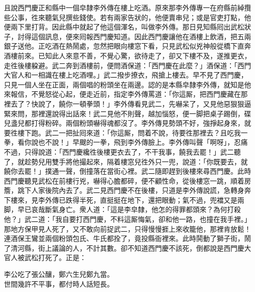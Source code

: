 且說西門慶正和縣中一個皁隸李外傳在樓上吃酒。原來那李外傳專一在府縣前綽攬些公事，徃來聽氣兒撰些錢使。若有兩家告狀的，他便賣串兒；或是官吏打點，他便兩下里打背。因此縣中就起了他這個渾名，叫做李外傳。那日見知縣囘出武松狀子，討得這個訊息，便來囘報西門慶知道。因此西門慶讓他在酒樓上飲酒，把五兩銀子送他。正吃酒在熱鬧處，忽然把眼向樓窓下看，只見武松似兇神般從橋下直奔酒樓前來。已知此人來意不善，不覺心驚，欲待走了，卻又下樓不及，遂推更衣，走徃後樓躱避。武二奔到酒樓前，便問酒保道：「西門慶在此麼？」酒保道：「西門大官人和一相識在樓上吃酒哩。」武二撥步撩衣，飛搶上樓去。早不見了西門慶，只見一個人坐在正面，兩個唱的粉頭坐在兩邊。{}認的是本縣皁隸李外傳，就知是他來報信，不覺怒從心起，便走近前，指定李外傳罵道：「你這厮，把西門慶藏在那裡去了？快說了，饒你一頓拳頭！」李外傳看見武二，先嚇呆了，又見他惡狠狠逼緊來問，那裡還說得出話來！武二見他不則聲，越加惱怒，便一脚把桌子踢倒，碟兒盞兒都打得粉碎。兩個粉頭嚇得魂都沒了。李外傳見勢頭不好，強掙起身來，就要徃樓下跑。武二一把扯囘來道：「你這厮，問着不說，待要徃那裡去？且吃我一拳，看你說也不說！」早颼的一拳，飛到李外傳臉上。李外傳叫聲「啊呀」，忍痛不過，只得說道：「西門慶纔徃後樓更衣去了，不干我事，饒我去罷！」武二聽了，就趁勢兒用雙手將他撮起來，隔着樓窓兒徃外只一兜，說道：「你既要去，就饒你去罷！」撲通一聲，倒撞落在當街心裡。武二隨即趕到後樓來尋西門慶。此時西門慶聽見武松在前樓行兇，嚇得心膽都碎，便不顧性命，從後樓窓一跳，順着房簷，跳下人家後院內去了。武二見西門慶不在後樓，只道是李外傳說謊，急轉身奔下樓來，見李外傳已跌得半死，直挺挺在地下，還把眼動；氣不過，兜襠又是兩脚，早已哀哉斷氣身亡。衆人道：「這是李皁隸，他怎的得罪都頭來？為何打殺他？」武二道：「我自要打西門慶，不料這厮悔氣，卻和他一路，也撞在我手裡。」那地方保甲見人死了，又不敢向前捉武二，只得慢慢捱上來收籠他，那裡肯放鬆！連酒保王鸞並兩個粉頭包氏、牛氏都拴了，竟投縣衙裡來。此時鬨動了獅子街，鬧了清河縣，街上議論的人，不計其數。卻不知道西門慶不該死，倒都說是西門慶大官人被武松打死了。{}正是：

\begin{myquote}
李公吃了張公釀，鄭六生兒鄭九當。\\世間幾許不平事，都付時人話短長。
\end{myquote}

 

